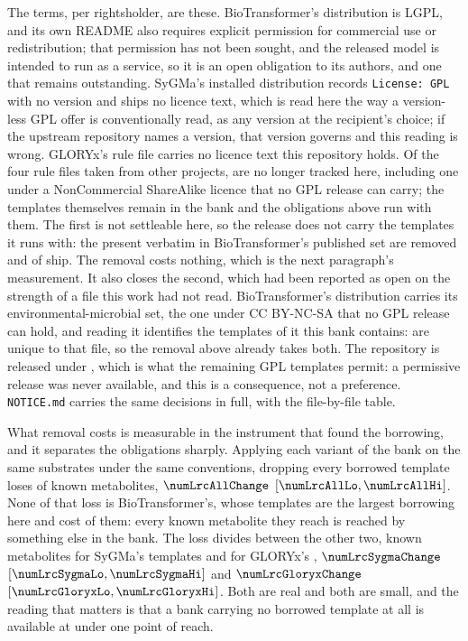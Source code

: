 \documentclass[journal=jcisd8,manuscript=suppinfo,layout=onecolumn]{achemso}
\begin{document}
The terms, per rightsholder, are these. BioTransformer's distribution is LGPL, and its own README
also requires explicit permission for commercial use or redistribution; that permission
has not been sought, and the released model is intended to run as a service, so it is an open
obligation to its authors, and one that remains outstanding. SyGMa's installed distribution records
\texttt{License: GPL} with no version and ships no licence text, which is read here the way a
version-less GPL offer is conventionally read, as any version at the recipient's choice; if the
upstream repository names a version, that version governs and this reading is wrong. GLORYx's rule
file carries no licence text this repository holds. Of the four rule files taken from other
projects, \numThirdpartyFilesunusedWord{} are no longer tracked here, including one under a
NonCommercial ShareAlike licence that no GPL release can carry; the templates themselves remain in
the bank and the obligations above run with them. The first is not settleable here, so the release
does not carry the templates it
runs with: the \numRelbankRemoved{} present verbatim in BioTransformer's published set are removed
and \numRelbankReleased{} of \numRelbankMeasured{} ship. The removal costs nothing, which is the
next paragraph's measurement. It also closes the second, which had been reported as open on the
strength of a file this work had not read. BioTransformer's distribution carries its
environmental-microbial set, the one under CC BY-NC-SA that no GPL release can hold, and reading it
identifies the \numRelbankEnvmicroWord{} templates of it this bank contains:
\numRelbankEnvmicroonly{} are unique to that file, so the removal above
already takes both. The repository is released under \RepoLicence{}, which is what the
remaining GPL templates permit: a permissive release was never available, and this is a
consequence, not a preference.
\texttt{NOTICE.md} carries the same decisions in full, with the file-by-file table.

What removal costs is measurable in the instrument that found the borrowing, and it separates the
obligations sharply. Applying each variant of the bank on the same substrates under the same
conventions, dropping every borrowed template loses \numLrcAllLost{} of \numLrcReferences{}
known metabolites, $\numLrcAllChange$ $[\numLrcAllLo, \numLrcAllHi]$. None of that loss is
BioTransformer's, whose \numThirdpartyBiotransformerShipped{} templates are the largest borrowing
here and cost \numLrcBtLostWord{} of them: every known metabolite they reach is reached by something
else in the bank. The loss divides between the other two, \numLrcSygmaLost{} known metabolites for SyGMa's
\numLrcSygmaDropped{} templates and \numLrcGloryxLost{} for GLORYx's \numLrcGloryxDropped{},
$\numLrcSygmaChange$ $[\numLrcSygmaLo, \numLrcSygmaHi]$ and $\numLrcGloryxChange$
$[\numLrcGloryxLo, \numLrcGloryxHi]$. Both are real and both are small, and the reading that
matters is that a bank carrying no borrowed template at all is available at under one point of
reach. \CuratedProvenance{}
\end{document}
